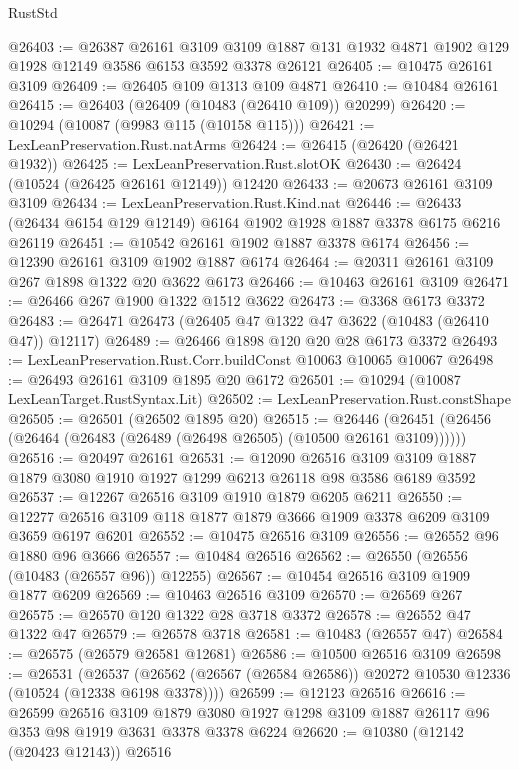 \begin{lexlean}{RustStd}
\begin{coremodule}
@26403 := @26387
    @26161
    @3109
    @3109
    @1887
    @131
    @1932
    @4871
    @1902
    @129
    @1928
    @12149
    @3586
    @6153
    @3592
    @3378
    @26121
@26405 := @10475 @26161 @3109
@26409 := @26405 @109 @1313 @109 @4871
@26410 := @10484 @26161
@26415 := @26403 (@26409 (@10483 (@26410 @109)) @20299)
@26420 := @10294 (@10087 (@9983 @115 (@10158 @115)))
@26421 := LexLeanPreservation.Rust.natArms
@26424 := @26415 (@26420 (@26421 @1932))
@26425 := LexLeanPreservation.Rust.slotOK
@26430 := @26424 (@10524 (@26425 @26161 @12149)) @12420
@26433 := @20673 @26161 @3109 @3109
@26434 := LexLeanPreservation.Rust.Kind.nat
@26446 := @26433 (@26434 @6154 @129 @12149) @6164 @1902 @1928 @1887 @3378 @6175 @6216 @26119
@26451 := @10542 @26161 @1902 @1887 @3378 @6174
@26456 := @12390 @26161 @3109 @1902 @1887 @6174
@26464 := @20311 @26161 @3109 @267 @1898 @1322 @20 @3622 @6173
@26466 := @10463 @26161 @3109
@26471 := @26466 @267 @1900 @1322 @1512 @3622
@26473 := @3368 @6173 @3372
@26483 := @26471 @26473 (@26405 @47 @1322 @47 @3622 (@10483 (@26410 @47)) @12117)
@26489 := @26466 @1898 @120 @20 @28 @6173 @3372
@26493 := LexLeanPreservation.Rust.Corr.buildConst @10063 @10065 @10067
@26498 := @26493 @26161 @3109 @1895 @20 @6172
@26501 := @10294 (@10087 LexLeanTarget.RustSyntax.Lit)
@26502 := LexLeanPreservation.Rust.constShape
@26505 := @26501 (@26502 @1895 @20)
@26515 := @26446 (@26451 (@26456 (@26464 (@26483 (@26489 (@26498 @26505) (@10500 @26161 @3109))))))
@26516 := @20497 @26161
@26531 := @12090
    @26516
    @3109
    @3109
    @1887
    @1879
    @3080
    @1910
    @1927
    @1299
    @6213
    @26118
    @98
    @3586
    @6189
    @3592
@26537 := @12267 @26516 @3109 @1910 @1879 @6205 @6211
@26550 := @12277 @26516 @3109 @118 @1877 @1879 @3666 @1909 @3378 @6209 @3109 @3659 @6197 @6201
@26552 := @10475 @26516 @3109
@26556 := @26552 @96 @1880 @96 @3666
@26557 := @10484 @26516
@26562 := @26550 (@26556 (@10483 (@26557 @96)) @12255)
@26567 := @10454 @26516 @3109 @1909 @1877 @6209
@26569 := @10463 @26516 @3109
@26570 := @26569 @267
@26575 := @26570 @120 @1322 @28 @3718 @3372
@26578 := @26552 @47 @1322 @47
@26579 := @26578 @3718
@26581 := @10483 (@26557 @47)
@26584 := @26575 (@26579 @26581 @12681)
@26586 := @10500 @26516 @3109
@26598 := @26531
    (@26537 (@26562 (@26567 (@26584 @26586)) @20272 @10530 @12336 (@10524 (@12338 @6198 @3378))))
@26599 := @12123 @26516
@26616 := @26599
    @26516
    @3109
    @1879
    @3080
    @1927
    @1298
    @3109
    @1887
    @26117
    @96
    @353
    @98
    @1919
    @3631
    @3378
    @3378
    @6224
@26620 := @10380 (@12142 (@20423 @12143)) @26516

\end{coremodule}
\end{lexlean}
